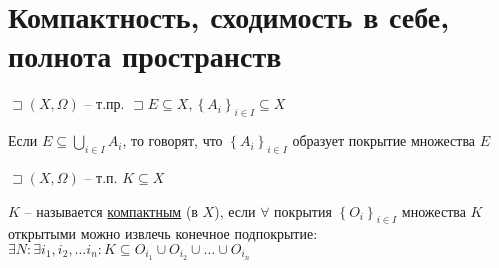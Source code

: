 \documentclass{book}
\theoremstyle{definition}
\begin{document}
\section{Компактность, сходимость в себе, полнота пространств}

\begin{definition}
    $\sqsupset (X, \Omega)$ -- т.пр. $\sqsupset E\subseteq X, \left\{ A_i \right\} _{i\in I}\subseteq X$

    Если $E \subseteq \bigcup\limits_{i \in  I} A_i$, то говорят, что $\left\{ A_i \right\} _{i\in I}$ образует покрытие множества $E$ 
\end{definition}

\begin{definition}
    $\sqsupset (X,\Omega)$ -- т.п. $K\subseteq X$

    $K$ -- называется \underline{компактным} (в  $X$), если  $\forall $ покрытия $\left\{ O_i \right\} _{i\in I}$ множества $K$ открытыми можно извлечь конечное подпокрытие:  $\exists N: \exists i_1, i_2, \ldots i_n: K\subseteq O_{i_1}\cup O_{i_2} \cup  \ldots \cup  O_{i_n}$
\end{definition}
\end{document}
